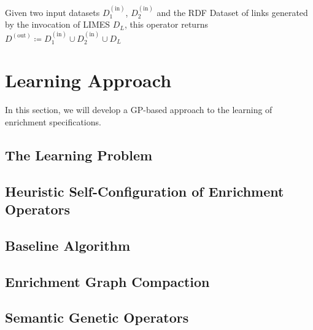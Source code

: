 Given two input datasets $D_1^{(\text{in})}$, $D_2^{(\text{in})}$ and the \ac{RDF} Dataset of links generated by the invocation of \ac{LIMES} $D_L$, this operator returns $D^{(\text{out})}\coloneq D_1^{(\text{in})}\cup D_2^{(\text{in})}\cup D_L$
\section{Learning Approach}
\label{sec:gpapproach}

In this section, we will develop a \ac{GP}-based approach to the learning of enrichment specifications.

\subsection{The Learning Problem}
\label{ssec:learningproblem}

\subsection{Heuristic Self-Configuration of Enrichment Operators}
\label{ssec:selfconfig}

\subsection{Baseline Algorithm}
\label{ssec:baseline}

\subsection{Enrichment Graph Compaction}
\label{ssec:compaction}

\subsection{Semantic Genetic Operators}
\label{ssec:sgoapproach}
